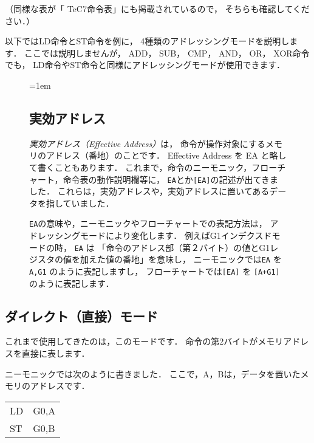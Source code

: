 （同様な表が「 TeC7命令表」にも掲載されているので，
  そちらも確認してください．）

以下ではLD命令とST命令を例に，
4種類のアドレッシングモードを説明します．
ここでは説明しませんが，
ADD， SUB， CMP， AND， OR， XOR命令でも，
LD命令やST命令と同様にアドレッシングモードが使用できます．

\begin{figure}[btp]
  \begin{framed}{\parindent=1em
      \subsection*{実効アドレス}
      \emph{実効アドレス（Effective Address）}は，
      命令が操作対象にするメモリのアドレス（番地）のことです．
      Effective Address を EA と略して書くこともあります．
      これまで，命令のニーモニック，フローチャート，命令表の動作説明欄等に，
      \texttt{EA}とか\texttt{[EA]}の記述が出てきました．
      これらは，実効アドレスや，実効アドレスに置いてあるデータを指していました．

      \texttt{EA}の意味や，ニーモニックやフローチャートでの表記方法は，
      アドレッシングモードにより変化します．
      例えばG1インデクスドモードの時，
      \texttt{EA} は
      「命令のアドレス部（第２バイト）の値とG1レジスタの値を加えた値の番地」を意味し，
      ニーモニックでは\texttt{EA} を \texttt{A,G1} のように表記しますし，
      フローチャートでは\texttt{[EA]} を \texttt{[A+G1]} のように表記します．
  }\end{framed}
\end{figure}

\subsection{ダイレクト（直接）モード}
これまで使用してきたのは，このモードです．
命令の第2バイトがメモリアドレスを直接に表します．

ニーモニックでは次のように書きました．
ここで，A，Bは，データを置いたメモリのアドレスです．

{\ttfamily\begin{center}
  \begin{tabular}{l l}
    LD & G0,A \\
    ST & G0,B \\
  \end{tabular}
\end{center}}

